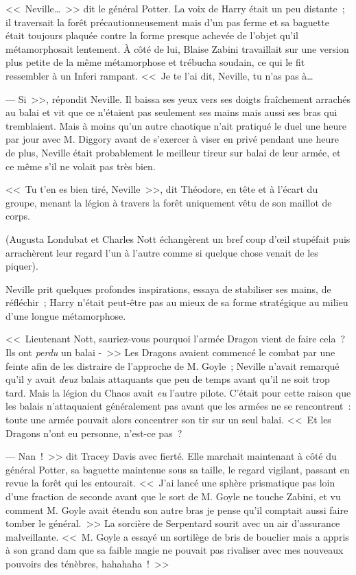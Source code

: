 <<~Neville…~>> dit le général Potter. La voix de Harry était un peu distante~; il traversait la forêt précautionneusement mais d'un pas ferme et sa baguette était toujours plaquée contre la forme presque achevée de l'objet qu'il métamorphosait lentement. À côté de lui, Blaise Zabini travaillait sur une version plus petite de la même métamorphose et trébucha soudain, ce qui le fit ressembler à un Inferi rampant. <<~Je te l'ai dit, Neville, tu n'as pas à…

--- Si~>>, répondit Neville. Il baissa ses yeux vers ses doigts fraîchement arrachés au balai et vit que ce n'étaient pas seulement ses mains mais aussi ses bras qui tremblaient. Mais à moins qu'un autre chaotique n'ait pratiqué le duel une heure par jour avec M. Diggory avant de s'exercer à viser en privé pendant une heure de plus, Neville était probablement le meilleur tireur sur balai de leur armée, et ce même s'il ne volait pas très bien.

<<~Tu t'en es bien tiré, Neville~>>, dit Théodore, en tête et à l'écart du groupe, menant la légion à travers la forêt uniquement vêtu de son maillot de corps.

(Augusta Londubat et Charles Nott échangèrent un bref coup d'œil stupéfait puis arrachèrent leur regard l'un à l'autre comme si quelque chose venait de les piquer).

Neville prit quelques profondes inspirations, essaya de stabiliser ses mains, de réfléchir~; Harry n'était peut-être pas au mieux de sa forme stratégique au milieu d'une longue métamorphose.

<<~Lieutenant Nott, sauriez-vous pourquoi l'armée Dragon vient de faire cela~? Ils ont \emph{perdu} un balai -~>> Les Dragons avaient commencé le combat par une feinte afin de les distraire de l'approche de M. Goyle~; Neville n'avait remarqué qu'il y avait \emph{deux} balais attaquants que peu de temps avant qu'il ne soit trop tard. Mais la légion du Chaos avait \emph{eu} l'autre pilote. C'était pour cette raison que les balais n'attaquaient généralement pas avant que les armées ne se rencontrent~: toute une armée pouvait alors concentrer son tir sur un seul balai. <<~Et les Dragons n'ont eu personne, n'est-ce pas~?

--- Nan~!~>> dit Tracey Davis avec fierté. Elle marchait maintenant à côté du général Potter, sa baguette maintenue sous sa taille, le regard vigilant, passant en revue la forêt qui les entourait. <<~J'ai lancé une sphère prismatique pas loin d'une fraction de seconde avant que le sort de M. Goyle ne touche Zabini, et vu comment M. Goyle avait étendu son autre bras je pense qu'il comptait aussi faire tomber le général.~>> La sorcière de Serpentard sourit avec un air d'assurance malveillante. <<~M. Goyle a essayé un sortilège de bris de bouclier mais a appris à son grand dam que sa faible magie ne pouvait pas rivaliser avec mes nouveaux pouvoirs des ténèbres, hahahaha~!~>>

